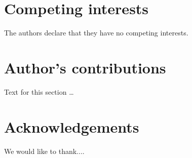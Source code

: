 \documentclass{bmcart}
\begin{document}
\begin{backmatter}

\section*{Competing interests}
  The authors declare that they have no competing interests.

\section*{Author's contributions}
    Text for this section \ldots

\section*{Acknowledgements}
  We would like to thank....
  
  





\end{backmatter}
\end{document}
